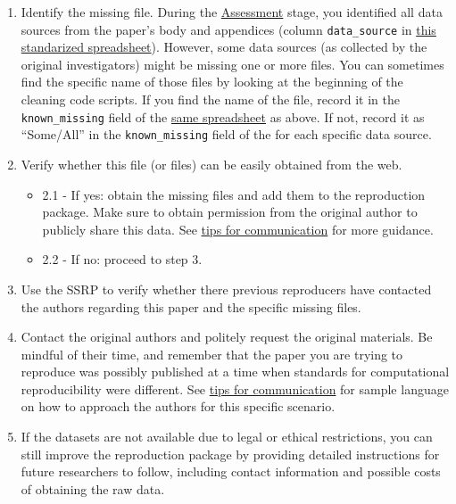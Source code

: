 \documentclass[
]{book}
\providecommand{\tightlist}{%
  \setlength{\itemsep}{0pt}\setlength{\parskip}{0pt}}
\begin{document}
\begin{enumerate}
\def\labelenumi{\arabic{enumi}.}
\tightlist
\item
  Identify the missing file. During the \protect\hyperlink{assessment}{Assessment} stage, you identified all data sources from the paper's body and appendices (column \texttt{data\_source} in \href{https://docs.google.com/spreadsheets/d/1LUIdVFH0OfR70C7z07TYeE-uWzKI_JIeWUMaYhqEKK0/edit\#gid=0\&range=A1}{this standarized spreadsheet}). However, some data sources (as collected by the original investigators) might be missing one or more files. You can sometimes find the specific name of those files by looking at the beginning of the cleaning code scripts. If you find the name of the file, record it in the \texttt{known\_missing} field of the \href{https://docs.google.com/spreadsheets/d/1LUIdVFH0OfR70C7z07TYeE-uWzKI_JIeWUMaYhqEKK0/edit\#gid=0\&range=A1}{same spreadsheet} as above. If not, record it as ``Some/All'' in the \texttt{known\_missing} field of the for each specific data source.\\
\item
  Verify whether this file (or files) can be easily obtained from the web.

  \begin{itemize}
  \tightlist
  \item
    2.1 - If yes: obtain the missing files and add them to the reproduction package. Make sure to obtain permission from the original author to publicly share this data. See \href{https://bitss.github.io/ACRE/guidance-for-a-constructive-exchange-between-reproducers-and-original-authors.html}{tips for communication} for more guidance.\\
  \item
    2.2 - If no: proceed to step 3.\\
  \end{itemize}
\item
  Use the SSRP to verify whether there previous reproducers have contacted the authors regarding this paper and the specific missing files.\\
\item
  Contact the original authors and politely request the original materials. Be mindful of their time, and remember that the paper you are trying to reproduce was possibly published at a time when standards for computational reproducibility were different. See \href{https://bitss.github.io/ACRE/guidance-for-a-constructive-exchange-between-reproducers-and-original-authors.html}{tips for communication} for sample language on how to approach the authors for this specific scenario.\\
\item
  If the datasets are not available due to legal or ethical restrictions, you can still improve the reproduction package by providing detailed instructions for future researchers to follow, including contact information and possible costs of obtaining the raw data.
\end{enumerate}
\end{document}
